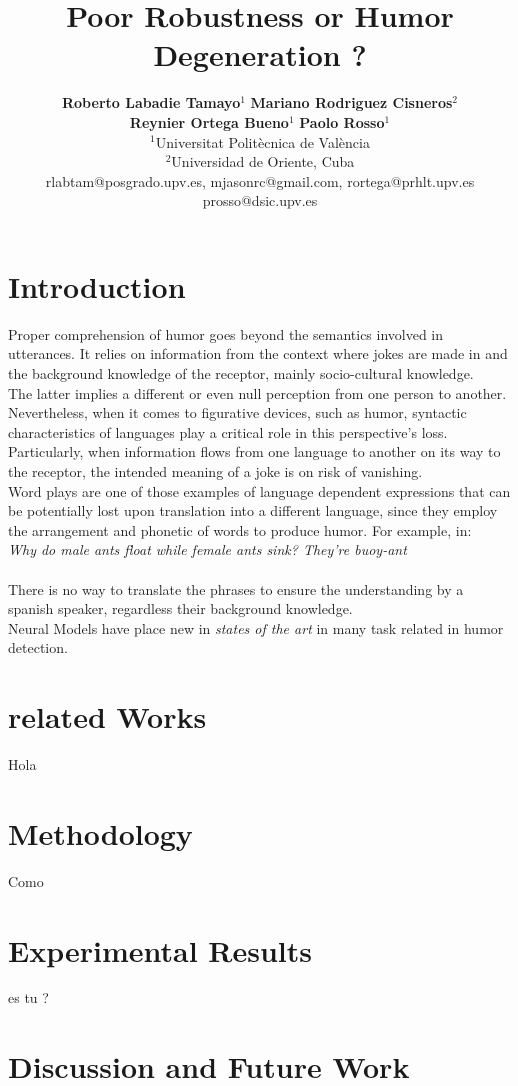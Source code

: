 \documentclass[a4paper,11pt,twocolumn,twoside]{article}
\title{Poor Robustness or Humor Degeneration ?}
\author {\textbf{Roberto Labadie Tamayo$^1$} \textbf{Mariano Rodriguez Cisneros$^2$} \\
 \textbf{Reynier Ortega  Bueno$^1$}  \textbf{Paolo Rosso$^1$}\\
$^1$Universitat Politècnica de València\\
$^2$Universidad de Oriente, Cuba\\
rlabtam@posgrado.upv.es, mjasonrc@gmail.com, rortega@prhlt.upv.es\\
prosso@dsic.upv.es\\
}
\begin{document}



\label{firstpage} \maketitle


\section{Introduction}

Proper comprehension of humor goes beyond the semantics involved in utterances. It relies on information from the context where jokes are made in and the background knowledge of the receptor, mainly socio-cultural knowledge. 
\\
The latter implies a different or even null perception from one person to another. Nevertheless, when it comes to figurative devices, such as humor, syntactic characteristics of languages play a critical role in this perspective's loss. Particularly, when information flows from one language to another on its way to the receptor, the intended meaning of a joke is on risk of vanishing.
\\
Word plays are one of those examples of language dependent expressions that can be potentially lost upon translation into a different language, since they employ the arrangement and phonetic of words to produce humor.
For example, in:\\

\textit{Why do male ants float while female ants sink? They're buoy-ant}
\\\\
There is no way to translate the phrases to ensure the understanding by a spanish speaker, regardless their background knowledge.
\\
Neural Models have place new in\textit{ states of the art} in many task related in humor detection.
\section{related Works}
Hola


\section{Methodology}

Como

\section{Experimental Results}

es tu ?

\section{Discussion and Future Work}



\end{document}
